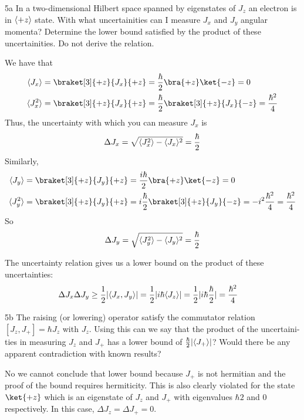 \documentclass[12pt]{article}
\begin{document}
\newpage 
\begin{exc}{5a}
In a two-dimensional Hilbert space spanned by eigenstates of $J_z$ an
electron is in $\langle{+z}\rangle$ state. With what uncertainities can I measure $J_x$
and $J_y$ angular momenta? Determine the lower bound satisfied by the
product of these uncertainities. Do not derive the relation.
\end{exc}
\begin{ans}
    We have that 
    \begin{align*}
        \ev{J_x} &= \braket[3]{+z}{J_x}{+z} = \frac{\hbar}2\bra{+z} \ket{-z} = 0\\ 
        \ev{J_x^2} &= \braket[3]{+z}{J_x}{+z} =  \frac{\hbar}2\braket[3]{+z}{J_x}{-z} = \frac{\hbar^2}{4} 
    \end{align*}
    Thus, the uncertainty with which you can measure $J_x$ is 
    \[\Delta J_x = \sqrt{\langle{J_x^2}\rangle -\langle{J_x}\rangle^2} = \frac \hbar 2\]
    Similarly, 
        \begin{align*}
        \ev{J_y} &= \braket[3]{+z}{J_y}{+z} = \frac{i\hbar}2\bra{+z} \ket{-z} = 0\\ 
        \ev{J_y^2} &= \braket[3]{+z}{J_y}{+z} =  i\frac{\hbar}2\braket[3]{+z}{J_y}{-z} = -i^2\frac{\hbar^2}{4} = \frac{\hbar^2}{4} 
    \end{align*}
    So 
    \[\Delta J_y = \sqrt{\langle{J_y^2}\rangle -\langle{J_y}\rangle^2} = \frac \hbar 2\]

    The uncertainty relation gives us a lower bound on the product of these uncertainties: 
    \begin{align*}
        \Delta J_x \Delta J_y &\geq \frac 12 |\langle{J_x, J_y}\rangle| = \frac12 |i\hbar \langle{J_z}\rangle| = \frac 12 |i \hbar \frac\hbar 2| = \frac{\hbar^2}{4}
    \end{align*}
\end{ans}

\begin{exc}{5b}
    The raising (or lowering) operator satisfy the commutator relation $[J_z,J_+] =
\hbar J_z$ with $J_z$. Using this can we say that the product of the uncertaini-
ties in measuring $J_z$ and $J_+$ has a lower bound of $\frac \hbar 2 |\langle{J_+}\rangle|$? Would there be any apparent contradiction with known results?
\end{exc}
\begin{ans}
No we cannot conclude that lower bound because $J_+$ is not hermitian and the proof of the bound requires hermiticity. This is also clearly violated for the state $\ket{+z}$ which is an eigenstate of $J_z$ and $J_+$ with eigenvalues $\hbar 2$ and $0$ respectively. In this case, $\Delta J_z = \Delta J_+ = 0$.
\end{ans}
\end{document}
